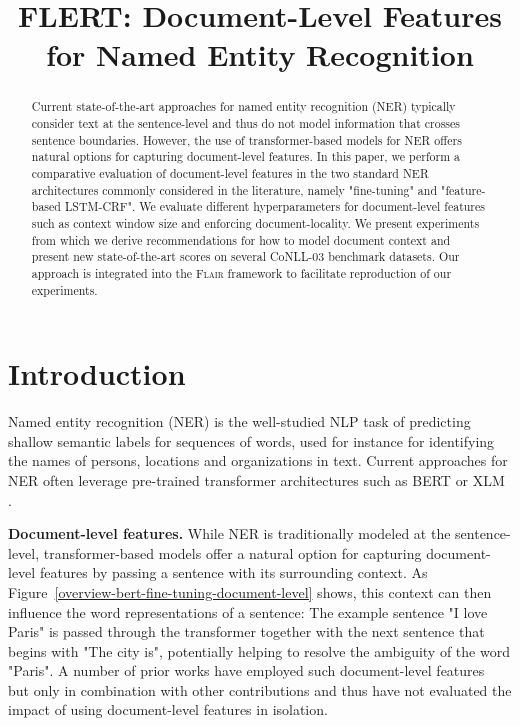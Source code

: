 \title{FLERT: Document-Level Features for Named Entity Recognition}



\maketitle
\begin{abstract}

Current state-of-the-art approaches for named entity recognition (NER) typically consider text at the sentence-level and thus do not model information that crosses sentence boundaries. However, the use of transformer-based models for NER offers natural options for capturing document-level features. In this paper, we perform a comparative evaluation of document-level features in the two standard NER architectures commonly considered in the literature, namely "fine-tuning" and "feature-based LSTM-CRF". We evaluate different hyperparameters for document-level features such as context window size and enforcing document-locality. We present experiments from which we derive recommendations for how to model document context and present new state-of-the-art scores on several CoNLL-03 benchmark datasets. Our approach is integrated into the \textsc{Flair} framework to facilitate reproduction of our experiments. 

\end{abstract}

\section{Introduction}
\vspace{-1mm}

Named entity recognition (NER) is the well-studied NLP task of predicting shallow semantic labels for sequences of words, used for instance for identifying the names of persons, locations and organizations in text. Current approaches for NER often leverage pre-trained transformer architectures such as BERT \citep{devlin-etal-2019-bert} or XLM \citep{lample2019cross}.

\noindent 
\textbf{Document-level features.} While NER is traditionally modeled at the sentence-level, transformer-based models offer a natural option for capturing document-level features by passing a sentence with its surrounding context. As Figure~\ref{overview-bert-fine-tuning-document-level} shows, this context can then influence the word representations of a sentence: The example sentence "I love Paris" is passed through the transformer together with the next sentence that begins with "The city is", potentially helping to resolve the ambiguity of the word "Paris".  
A number of prior works have employed such document-level features~\cite{devlin-etal-2019-bert, virtanen2019multilingual,yu-etal-2020-named} but only in combination with other contributions and thus have not evaluated the impact of using document-level features in isolation. 

